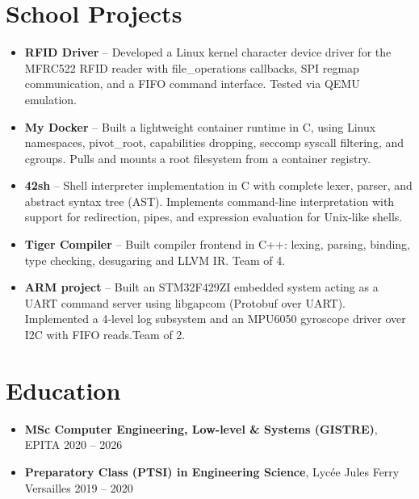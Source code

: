 \documentclass[9pt,a4paper]{article}
\begin{document}
\section*{School Projects}
\begin{tcolorbox}[mybox]
\begin{itemize}
\item \textbf{RFID Driver} -- Developed a Linux kernel character device driver for the MFRC522 RFID reader with file\_operations callbacks, SPI regmap communication, and a FIFO command interface. Tested via QEMU emulation.

\item \textbf{My Docker} -- Built a lightweight container runtime in C, using Linux namespaces, pivot\_root, capabilities dropping, seccomp syscall filtering, and cgroups. Pulls and mounts a root filesystem from a container registry.

\item \textbf{42sh} -- Shell interpreter implementation in C with complete lexer, parser, and abstract syntax tree (AST). Implements command-line interpretation with support for redirection, pipes, and expression evaluation for Unix-like shells.

\item \textbf{Tiger Compiler} -- Built compiler frontend in C++: lexing, parsing, binding, type checking, desugaring and LLVM IR. Team of 4.

\item \textbf{ARM project} -- Built an STM32F429ZI embedded system acting as a UART command server using libgapcom (Protobuf over UART). Implemented a 4-level log subsystem and an MPU6050 gyroscope driver over I2C with FIFO reads.Team of 2.
\end{itemize}
\end{tcolorbox}


\section*{Education}
\begin{tcolorbox}[mybox]
\begin{itemize}
\item \textbf{MSc Computer Engineering, Low-level \& Systems (GISTRE)}, EPITA {\small{\hfill 2020 – 2026}}

\item \textbf{Preparatory Class (PTSI) in Engineering Science}, Lycée Jules Ferry Versailles {\small{\hfill 2019 – 2020}}
\end{itemize}
\end{tcolorbox}
\end{document}
